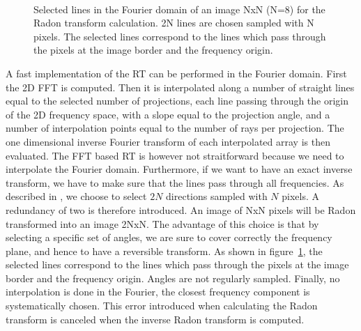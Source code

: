 \documentclass[11pt,a4paper]{article}
\begin{document}
\begin{figure}[htb]
\centerline{
\hbox{
}}
\caption{Selected lines in the Fourier domain of an image NxN (N=8) 
for the Radon transform calculation. 2N lines are chosen sampled with N pixels.
The selected lines correspond to the
lines which pass through the pixels at the image border and the 
frequency origin.}
\label{fig_radon}
\end{figure}

A fast implementation of the RT can be performed in the Fourier domain.
First the 2D FFT is computed. Then it is interpolated along a number 
of straight lines equal to the selected number of projections, each line
passing through the origin of the 2D frequency space, with a slope 
equal to the projection angle, and a number of interpolation points
equal to the number of rays per projection. The one dimensional inverse
Fourier transform of each interpolated array is then evaluated.
The FFT based RT  is however not straitforward because we need to 
interpolate the Fourier domain. Furthermore, if we want to have 
an exact inverse transform, we have to make sure that the lines
pass through all frequencies. 
As described in \cite{cur:candes98}, we choose to select $2N$ directions
sampled with $N$ pixels.  
A redundancy of two is therefore introduced.
An image of NxN pixels will be Radon transformed into an image 2NxN.
The advantage of this choice is that by selecting a specific set of 
angles, we are sure to cover correctly the frequency plane, and hence
to have a reversible transform. As shown in figure~\ref{fig_radon}, 
the selected lines correspond to the
lines which pass through the pixels at the image border and the 
frequency origin. Angles are not regularly sampled. Finally, no 
interpolation is done in the Fourier, the closest frequency component
is systematically chosen. This error introduced when calculating 
the Radon transform is canceled when the inverse Radon transform 
is computed.


 
\end{document}
